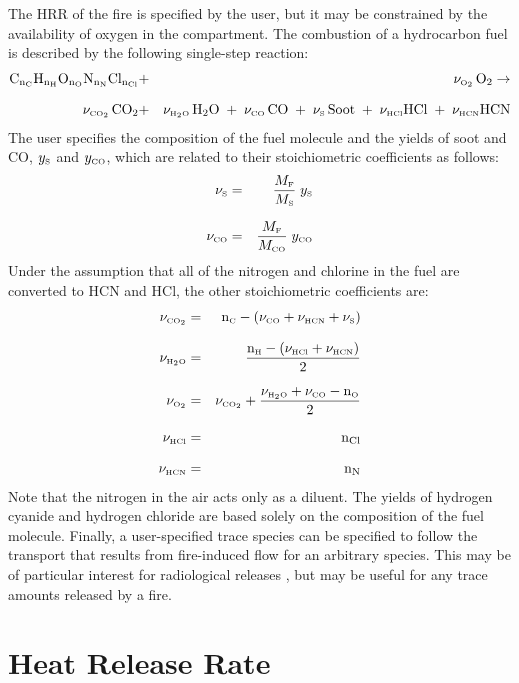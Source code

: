 \documentclass[12pt]{book}
\begin{document}
 The HRR of the fire is specified by the user, but it may be constrained by the availability of oxygen in the compartment. The combustion of a hydrocarbon fuel is described by the following single-step reaction:
\begin{eqnarray}
   \mathrm{C_{n_{\tiny \hbox{C}}}H_{n_H}O_{n_O}N_{n_N}Cl_{n_{Cl}}} &+&  \nu_{\tiny \hbox{O}_2} \, \mathrm{O_2}  \rightarrow  \nonumber \\[.1in]
   \nu_{\tiny \hbox{CO}_2} \, \mathrm{CO_2} &+& \nu_{\tiny \hbox{H}_2\hbox{O}} \, \mathrm{H_2O} \; + \; \nu_{\tiny \hbox{CO}} \, \mathrm{CO} \; + \; \nu_{\tiny \hbox{S}} \, \mathrm{Soot} \; + \; \nu_{\tiny \hbox{HCl}} \mathrm{HCl} \; + \; \nu_{\tiny \hbox{HCN}} \mathrm{HCN} \label{stoich}
\end{eqnarray}
The user specifies the composition of the fuel molecule and the yields of soot and CO, $y_{\tiny \hbox{S}}$ and $y_{\tiny \hbox{CO}}$, which are related to their stoichiometric coefficients as follows:
\begin{eqnarray}
   \nu_{\tiny \hbox{S}} &=& \frac{M_{\tiny \hbox{F}}}{M_{\tiny \hbox{S}}} \; y_{\tiny \hbox{S}} \label{soot_yield} \\[.1in]
   \nu_{\tiny \hbox{CO}} &=& \frac{M_{\tiny \hbox{F}}}{M_{\tiny \hbox{CO}}} \; y_{\tiny \hbox{CO}} \label{CO_yield}
\end{eqnarray}
Under the assumption that all of the nitrogen and chlorine in the fuel are converted to HCN and HCl, the other stoichiometric coefficients are:
\begin{eqnarray}
  \nu_{\tiny \hbox{CO}_2} &=& \mathrm{n_{\tiny \hbox{C}}} - { \left( {\nu_{\tiny \hbox{CO}} + \nu_{\tiny \hbox{HCN}} + \nu_{\tiny \hbox{S}}} \right) } \\[.1in]
  \nu_{\tiny \hbox{H}_2\hbox{O}} &=& \frac{\mathrm{n_{\tiny \hbox{H}}} - { \left( {\nu_{\tiny \hbox{HCl}} + \nu_{\tiny \hbox{HCN}}} \right) }}{2} \\[.1in]
  \nu_{\tiny \hbox{O}_2}  &=& \nu_{\tiny \hbox{CO}_2} + \frac{\nu_{\tiny \hbox{H}_2\hbox{O}} + \nu_{\tiny \hbox{CO}} - \mathrm{n_{\tiny \hbox{O}}}}{2} \label{Oxygen_yield} \\[.1in]
  \nu_{\tiny \hbox{HCl}}   &=& \mathrm{n_{Cl}} \\[.1in]
  \nu_{\tiny \hbox{HCN}}   &=& \mathrm{n_{N}}
\end{eqnarray}
Note that the nitrogen in the air acts only as a diluent. The yields of hydrogen cyanide and hydrogen chloride are based solely on the composition of the fuel molecule. Finally, a user-specified trace species can be specified to follow the transport that results from fire-induced flow for an arbitrary species. This may be of particular interest for radiological releases \cite{Jones:2008}, but may be useful for any trace amounts released by a fire.



\section{Heat Release Rate}
\label{section:HRR}
\end{document}

